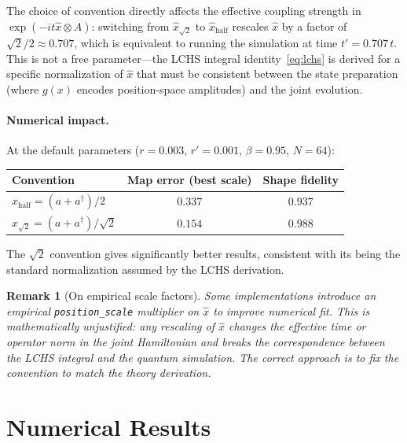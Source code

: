 \documentclass[11pt]{article}
\newtheorem{remark}{Remark}
\begin{document}
The choice of convention directly affects the effective coupling strength in
$\exp(-it\hat{x}\otimes A)$: switching from $\hat{x}_{\sqrt{2}}$ to
$\hat{x}_{\text{half}}$ rescales $\hat{x}$ by a factor of
$\sqrt{2}/2 \approx 0.707$, which is equivalent to running the simulation
at time $t' = 0.707\,t$.  This is not a free parameter---the LCHS integral
identity~\eqref{eq:lchs} is derived for a specific normalization of $\hat{x}$
that must be consistent between the state preparation (where $g(x)$ encodes
position-space amplitudes) and the joint evolution.

\paragraph{Numerical impact.}
At the default parameters ($r = 0.003$, $r' = 0.001$, $\beta = 0.95$,
$N = 64$):
\begin{center}
\begin{tabular}{lcc}
  \toprule
  Convention & Map error (best scale) & Shape fidelity \\
  \midrule
  $\hat{x}_{\text{half}} = (a+a^\dagger)/2$ & $0.337$ & $0.937$ \\
  $\hat{x}_{\sqrt{2}} = (a+a^\dagger)/\sqrt{2}$ & $\mathbf{0.154}$ & $\mathbf{0.988}$ \\
  \bottomrule
\end{tabular}
\end{center}

The $\sqrt{2}$ convention gives significantly better results, consistent with
its being the standard normalization assumed by the LCHS derivation.

\begin{remark}[On empirical scale factors]
Some implementations introduce an empirical \texttt{position\_scale} multiplier
on $\hat{x}$ to improve numerical fit.  This is mathematically unjustified:
any rescaling of $\hat{x}$ changes the effective time or operator norm in
the joint Hamiltonian and breaks the correspondence between the LCHS integral
and the quantum simulation.  The correct approach is to fix the convention
to match the theory derivation.
\end{remark}

\section{Numerical Results}
\end{document}
